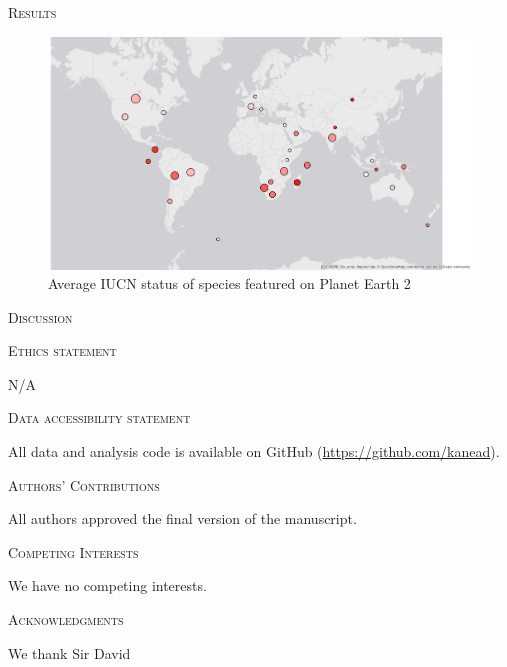 \documentclass[12pt,letterpaper]{article}
\renewcommand{\section}[1]{%
\bigskip
\begin{center}
\begin{Large}
\normalfont\scshape #1
\medskip
\end{Large}
\end{center}}
\begin{document}
\section{Results}

\begin{figure}[H]
\centering
    \includegraphics[keepaspectratio, totalheight=0.5 \textheight]{map2.jpg}
\caption{Average IUCN status of species featured on Planet Earth 2}
\label{info.diff}
\end{figure}


%
%

\section{Discussion}

\section{Ethics statement}
N/A
\section{Data accessibility statement}
All data and analysis code is available on GitHub (\url{https://github.com/kanead}).
\section{Authors' Contributions}
All authors approved the final version of the manuscript.
\section{Competing Interests}
We have no competing interests.
\section{Acknowledgments}
We thank Sir David 




\end{document}
